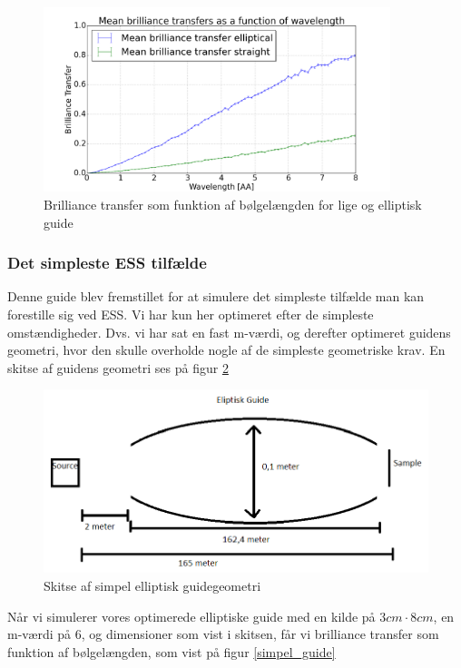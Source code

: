 \documentclass[12pt,oneside,a4paper]{article}
\begin{document}
{{{{{\begin{figure}[H]
\centering
\includegraphics[width=0.9\textwidth]{st_vs_elip_148950055477097.png}
\caption{Brilliance transfer som funktion af bølgelængden for lige og elliptisk guide} \label{st_vs_elip}
\end{figure}


\subsubsection{Det simpleste ESS tilfælde}
Denne guide blev fremstillet for at simulere det simpleste tilfælde man kan forestille sig ved ESS. Vi har kun her optimeret efter de simpleste omstændigheder. Dvs. vi har sat en fast m-værdi, og derefter optimeret guidens geometri, hvor den skulle overholde nogle af de simpleste geometriske krav.
En skitse af guidens geometri ses på figur \ref{Ellipse}

\begin{figure}[H]
\centering
\includegraphics[width=1\textwidth]{Elipse.png}
\caption{Skitse af simpel elliptisk guidegeometri} \label{Ellipse}
\end{figure}

Når vi simulerer vores optimerede elliptiske guide med en kilde på $3cm\cdot8cm$, en m-værdi på 6, og dimensioner som vist i skitsen, får vi brilliance transfer som funktion af bølgelængden, som vist på figur \ref{simpel_guide}

}}}}}
\end{document}
